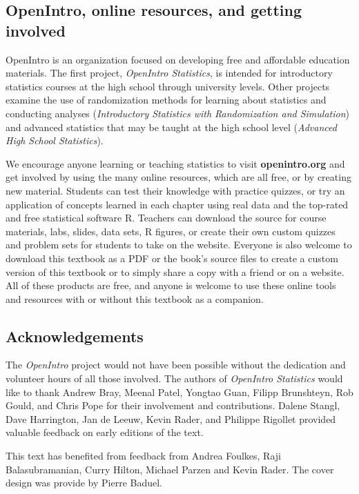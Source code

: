 \subsection*{OpenIntro, online resources, and getting involved}

OpenIntro is an organization focused on developing free and affordable education materials. The first project, \emph{OpenIntro Statistics}, is intended for introductory statistics courses at the high school through university levels. Other projects examine the use of randomization methods for learning about statistics and conducting analyses (\emph{Introductory Statistics with Randomization and Simulation}) and advanced statistics that may be taught at the high school level (\emph{Advanced High School Statistics}).

We encourage anyone learning or teaching statistics to visit \textbf{openintro.org} and get involved by using the many online resources, which are all free, or by creating new material. Students can test their knowledge with practice quizzes, or try an application of concepts learned in each chapter using real data and the top-rated and free statistical software \textsf{R}. Teachers can download the source for course materials, labs, slides, data sets, \textsf{R} figures, or create their own custom quizzes and problem sets for students to take on the website. Everyone is also welcome to download this textbook as a PDF or the book's source files to create a custom version of this textbook or to simply share a copy with a friend or on a website. All of these products are free, and anyone is welcome to use these online tools and resources with or without this textbook as a companion.


\subsection*{Acknowledgements}

The \emph{OpenIntro} project would not have been possible without the dedication and volunteer hours of all those involved.  The authors of \textsl{OpenIntro Statistics} would like to thank Andrew Bray, Meenal Patel, Yongtao Guan, Filipp Brunshteyn, Rob Gould, and Chris Pope for their involvement and contributions.  Dalene Stangl, Dave Harrington, Jan de Leeuw, Kevin Rader, and Philippe Rigollet provided valuable feedback on early editions of the text.

This text has benefited from feedback from Andrea Foulkes, Raji Balasubramanian, Curry Hilton, Michael Parzen and Kevin Rader.  The cover design was provide by Pierre Baduel.


